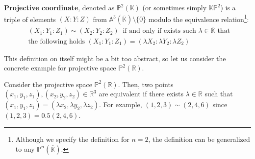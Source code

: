 \documentclass[../lecture-notes-148x210.tex]{subfiles}
\begin{document}
\begin{definition}
    \textbf{Projective coordinate}, denoted as $\mathbb{P}^2(\mathbb{K})$ (or sometimes simply $\mathbb{K}\mathbb{P}^2$) is a triple of elements $(X:Y:Z)$ from $\mathbb{A}^3(\overline{\mathbb{K}}) \setminus \{0\}$ modulo the equivalence relation\footnote{Although we specify the definition for $n=2$, the definition can be generalized to any $\mathbb{P}^n(\overline{\mathbb{K}})$.}:
    \begin{equation*}
        \begin{aligned}
            &(X_1:Y_1:Z_1) \sim (X_2:Y_2:Z_2) \;\; \text{if and only if exists such } \lambda \in \overline{\mathbb{K}} \text{ that } \\ 
            &\text{the following holds } (X_1:Y_1:Z_1) = (\lambda X_2: \lambda Y_2: \lambda Z_2)            
        \end{aligned}
    \end{equation*}
\end{definition}

This definition on itself might be a bit too abstract, so let us consider the concrete example for projective space $\mathbb{P}^2(\mathbb{R})$.

\begin{example}
    Consider the projective space $\mathbb{P}^2(\mathbb{R})$. Then, two points $(x_1,y_1,z_1),(x_2,y_2,z_2) \in \mathbb{R}^3$ are equivalent if there exists $\lambda \in \mathbb{R}$ such that $(x_1,y_1,z_1) = (\lambda x_2, \lambda y_2, \lambda z_2)$. For example, $(1,2,3) \sim (2,4,6)$ since $(1,2,3) = 0.5(2,4,6)$.
\end{example}
\end{document}
